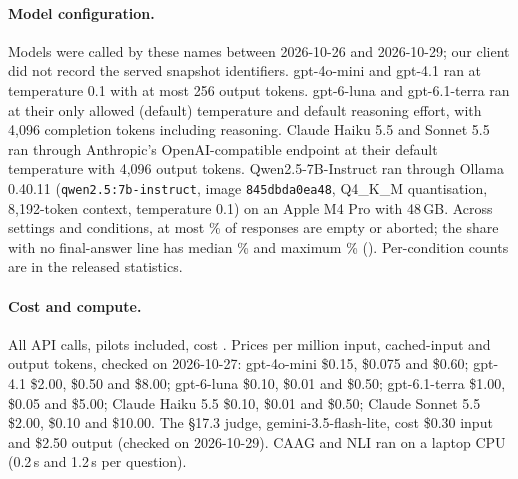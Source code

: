 \paragraph{Model configuration.} Models were called by these names between 2026-10-26 and 2026-10-29;
our client did not record the served snapshot identifiers. gpt-4o-mini and gpt-4.1 ran at temperature 0.1
with at most 256 output tokens. gpt-6-luna and gpt-6.1-terra ran at their only allowed (default) temperature and default
reasoning effort, with 4,096 completion tokens including reasoning. Claude Haiku 5.5 and Sonnet 5.5 ran through
Anthropic's OpenAI-compatible endpoint at their default temperature with 4,096 output tokens. Qwen2.5-7B-Instruct ran
through Ollama 0.40.11 (\texttt{qwen2.5:7b-instruct}, image \texttt{845dbda0ea48}, Q4\_K\_M quantisation, 8,192-token
context, temperature 0.1) on an Apple M4 Pro with 48\,GB. Across settings and conditions, at most \truncMaxEmpty\% of
responses are empty or aborted; the share with no final-answer line has median \truncMedNoFinal\% and maximum
\truncMaxNoFinal\% (\truncMaxAt). Per-condition counts are in the released statistics.

\paragraph{Cost and compute.} All API calls, pilots included, cost \totalSpend. Prices per million input, cached-input and output tokens, checked on 2026-10-27: gpt-4o-mini \$0.15, \$0.075 and \$0.60; gpt-4.1 \$2.00, \$0.50 and \$8.00; gpt-6-luna \$0.10, \$0.01 and \$0.50; gpt-6.1-terra \$1.00, \$0.05 and \$5.00; Claude Haiku 5.5 \$0.10, \$0.01 and
\$0.50; Claude Sonnet 5.5 \$2.00, \$0.10 and \$10.00. The \S17.3 judge, gemini-3.5-flash-lite, cost \$0.30 input and \$2.50 output (checked on 2026-10-29). CAAG and NLI ran on a
laptop CPU (0.2\,s and 1.2\,s per question).

